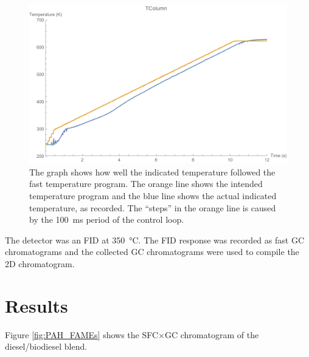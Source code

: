 \begin{figure}
	\centering
	\includegraphics[width=\textwidth]{Figures/Setpoint_Following.pdf}
	\decoRule	
	
\caption[The fidelity of a fast GC temperature program]{ The graph shows how
well the indicated temperature followed the fast temperature program. The orange
line shows the intended temperature program and the blue line shows the actual
indicated temperature, as recorded. The ``steps'' in the orange line is caused
by the \SI{100}{\milli\second} period of the control loop.}

	\label{fig:Setpoint_Following} 
\end{figure}

The detector was an FID at \SI{350}{\celsius}. The FID response was recorded as
fast GC chromatograms and the collected GC chromatograms were used to compile
the 2D chromatogram.

\section{Results}

Figure \ref{fig:PAH_FAMEs} shows the SFC×GC chromatogram of the diesel/biodiesel blend.

